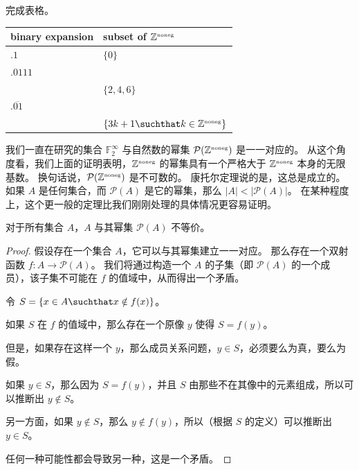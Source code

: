 \begin{exer}

    完成表格。
    \medskip

    \begin{center}
        \begin{tabular}{l|l}
            binary expansion                       & subset of ${\mathbb Z}^{\mbox{\tiny noneg}}$                  \\ \hline\hline
            \rule[-4pt]{0pt}{20pt} $.1$            & $\{0\}$                                \\\hline
            \rule[-4pt]{0pt}{20pt}$.0111$          &                                        \\\hline
            \rule[-4pt]{0pt}{20pt}                 & $\{2, 4, 6\}$                          \\\hline
            \rule[-4pt]{0pt}{20pt}$.\overline{01}$ &                                        \\\hline
            \rule[-4pt]{0pt}{20pt}                 & $\{3k + 1 \suchthat k \in \Naturals\}$ \\
        \end{tabular}
    \end{center}

\end{exer}

我们一直在研究的集合 ${\mathbb F}_2^\infty$ 与自然数的幂集 ${\mathcal P}({\mathbb Z}^{\mbox{\tiny noneg}})$ 是一一对应的。
从这个角度看，我们上面的证明表明，${\mathbb Z}^{\mbox{\tiny noneg}}$ 的幂集具有一个严格大于 ${\mathbb Z}^{\mbox{\tiny noneg}}$ 本身的无限基数。
换句话说，${\mathcal P}({\mathbb Z}^{\mbox{\tiny noneg}})$ 是不可数的。
康托尔定理说的是，这总是成立的。
如果 $A$ 是任何集合，而 ${\mathcal P}(A)$ 是它的幂集，那么 $|A| < |{\mathcal P}(A)|$。
在某种程度上，这个更一般的定理比我们刚刚处理的具体情况更容易证明。

\begin{thm}[康托尔]
    对于所有集合 $A$，$A$ 与其幂集 ${\mathcal P}(A)$ 不等价。
\end{thm}

\begin{proof}
    假设存在一个集合 $A$，它可以与其幂集建立一一对应。
    那么存在一个双射函数 $f : A \longrightarrow {\mathcal P}(A)$。
    我们将通过构造一个 $A$ 的子集（即 ${\mathcal P}(A)$ 的一个成员），该子集不可能在 $f$ 的值域中，从而得出一个矛盾。

    令 $S = \{x \in A \suchthat x \notin f(x)\}$。

    如果 $S$ 在 $f$ 的值域中，那么存在一个原像 $y$ 使得 $S = f(y)$。

    但是，如果存在这样一个 $y$，那么成员关系问题，$y \in S$，必须要么为真，要么为假。

    如果 $y \in S$，那么因为 $S = f(y)$，并且 $S$ 由那些不在其像中的元素组成，所以可以推断出 $y \notin S$。

    另一方面，如果 $y \notin S$，那么 $y \notin f(y)$，所以（根据 $S$ 的定义）可以推断出 $y \in S$。

    任何一种可能性都会导致另一种，这是一个矛盾。

\end{proof}

